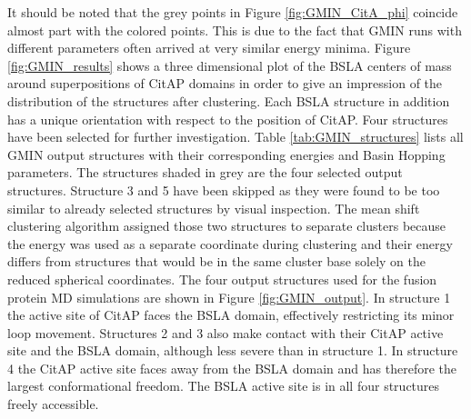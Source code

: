 \documentclass[english, a4paper, 12pt, titlepage, draft]{article}
\begin{document}
It should be noted that the grey points in Figure \ref{fig:GMIN_CitA_phi} coincide almost part with the colored points.
This is due to the fact that GMIN runs with different parameters often arrived at very similar energy minima.
Figure \ref{fig:GMIN_results} shows a three dimensional plot of the BSLA centers of mass around superpositions of CitAP domains in order to give an impression of the distribution of the structures after clustering.
Each BSLA structure in addition has a unique orientation with respect to the position of CitAP.
Four structures have been selected for further investigation.
Table \ref{tab:GMIN_structures} lists all GMIN output structures with their corresponding energies and Basin Hopping parameters.
The structures shaded in grey are the four selected output structures.
Structure 3 and 5 have been skipped as they were found to be too similar to already selected structures by visual inspection.
The mean shift clustering algorithm assigned those two structures to separate clusters because the energy was used as a separate coordinate during clustering and their energy differs from structures that would be in the same cluster base solely on the reduced spherical coordinates.
The four output structures used for the fusion protein MD simulations are shown in Figure \ref{fig:GMIN_output}.
In structure 1 the active site of CitAP faces the BSLA domain, effectively restricting its minor loop movement.
Structures 2 and 3 also make contact with their CitAP active site and the BSLA domain, although less severe than in structure 1.
In structure 4 the CitAP active site faces away from the BSLA domain and has therefore the largest conformational freedom.
The BSLA active site is in all four structures freely accessible.
\end{document}
